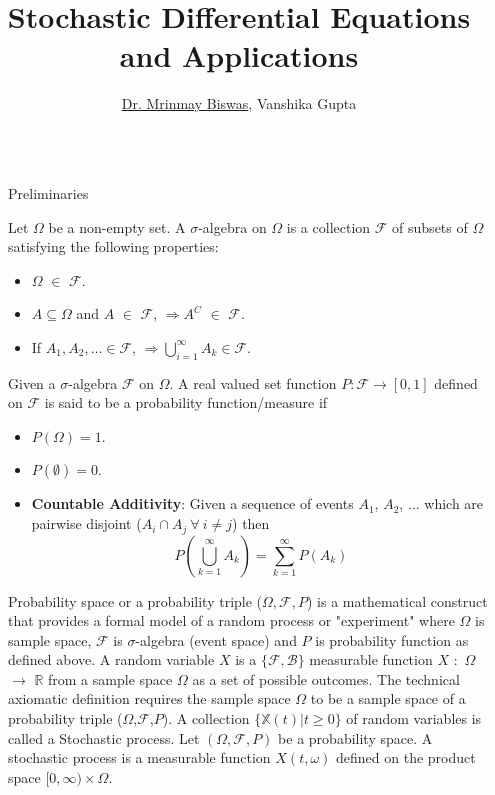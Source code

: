 \documentclass[final]{beamer}
\title{Stochastic Differential Equations and Applications}
\author{\href{https://www.iitk.ac.in/new/mrinmay-biswas}{Dr. Mrinmay Biswas}, Vanshika Gupta}
\institute[shortinst]{\href{https://www.iitk.ac.in/math/}{Department of Mathematics and Statistics, Indian Institute of Technology Kanpur}}
\newlength{\sepwidth}
\newlength{\colwidth}
\newcommand{\separatorcolumn}{\begin{column}{\sepwidth}\end{column}}
\begin{document}
\begin{frame}[t]
\begin{columns}[t]
\separatorcolumn

\begin{column}{\colwidth}

  \begin{block}{Preliminaries}

       Let $\Omega$ be a non-empty set. A $\sigma$-algebra on $\Omega$ is a collection $\mathcal{F}$ of subsets of $\Omega$ satisfying the following properties:
      \begin{itemize}
          \item $\Omega$ $\in$ $\mathcal{F}$.
          \item $A \subseteq \Omega$ and $A$ $\in$ $\mathcal{F}$, $\Rightarrow A ^ C$  $\in$ $\mathcal{F}$.
          \item  If $A_1, A_2, \dots \in \mathcal{F}$, $ \Rightarrow \bigcup_{i=1}^{\infty} A_k \in \mathcal{F}$.
       \end{itemize}
          Given a $\sigma$-algebra $\mathcal{F}$ on $\Omega$. A real valued set function $P \colon \mathcal{F} \rightarrow [0,1]$ defined on $\mathcal{F}$ is said to be a probability function/measure if
       \begin{itemize}
         \item $P(\Omega) = 1$.
         \item $P(\emptyset) = 0$.
         \item  \textbf{Countable Additivity}:
       Given a sequence of events $A_1$, $A_2$, $\dots$ which are pairwise disjoint ($A_i \cap A_j \ \forall \ i \neq j$) then \[
     P\left(\bigcup_{k=1}^\infty A_k\right) = \sum_{k=1}^\infty P(A_k)
     \]
      \end{itemize}
         Probability space or a probability triple ($\Omega,\mathcal{F},P$) is a mathematical construct that provides a formal model of a random process or "experiment" where $\Omega$ is sample space, $\mathcal{F}$ is $\sigma$-algebra (event space) and $P$ is probability function as defined above.
          A random variable $X$ is a $\{\mathcal{F},\mathcal{B}\}$ measurable function $X$ $\colon$ $\Omega$ $\to$ $\mathbb{R}$ from a sample space $\Omega$  as a set of possible outcomes. The technical axiomatic definition requires the sample space $\Omega $ to be a sample space of a probability triple 
       ($\Omega$,$\mathcal{F}$,$P$).
         A collection $\{\mathbb{X}(t) | t \geq 0\}$ of random variables is called a Stochastic process. Let $(\Omega, \mathcal{F}, P)$ be a probability space. A stochastic process is a measurable function $X(t, \omega)$ defined on the product space $[0,\infty) \times \Omega$.




\end{block}
\end{column}
\end{columns}
\end{frame}
\end{document}
